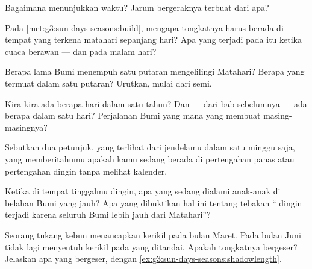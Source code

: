 \begin{exercise}[$\star$]\label{exo:g3:sun-days-seasons:4}
Bagaimana  menunjukkan waktu? Jarum bergeraknya terbuat
dari apa?
\end{exercise}

\begin{exercise}[$\star$]\label{exo:g3:sun-days-seasons:5}
Pada \cref{met:g3:sun-days-seasons:build}, mengapa tongkatnya harus
berada di tempat yang terkena matahari sepanjang hari? Apa yang
terjadi pada  itu ketika cuaca berawan --- dan pada malam hari?
\end{exercise}

\begin{exercise}[$\star$]\label{exo:g3:sun-days-seasons:6}
Berapa lama Bumi menempuh satu putaran mengelilingi Matahari? Berapa
 yang termuat dalam satu putaran? Urutkan, mulai dari  semi.
\end{exercise}

\begin{exercise}[$\star$]\label{exo:g3:sun-days-seasons:7}
Kira-kira ada berapa hari dalam satu tahun? Dan --- dari bab
sebelumnya --- ada berapa  dalam satu hari? Perjalanan Bumi yang
mana yang membuat masing-masingnya?
\end{exercise}

\begin{exercise}[$\star$]\label{exo:g3:sun-days-seasons:8}
Sebutkan dua petunjuk, yang terlihat dari jendelamu dalam satu minggu
saja, yang memberitahumu apakah kamu sedang berada di pertengahan
 panas atau pertengahan  dingin tanpa melihat kalender.
\end{exercise}

\begin{exercise}[$\star$]\label{exo:g3:sun-days-seasons:9}
Ketika di tempat tinggalmu  dingin,  apa yang sedang dialami
anak-anak di belahan Bumi yang jauh? Apa yang dibuktikan hal ini
tentang tebakan `` dingin terjadi karena seluruh Bumi lebih jauh
dari Matahari''?
\end{exercise}

\begin{exercise}[$\star\star$]\label{exo:g3:sun-days-seasons:10}
Seorang tukang kebun menancapkan kerikil   pada
bulan Maret. Pada bulan Juni  tidak lagi menyentuh
kerikil pada  yang ditandai. Apakah tongkatnya bergeser? Jelaskan
apa yang bergeser, dengan \cref{ex:g3:sun-days-seasons:shadowlength}.
\end{exercise}

